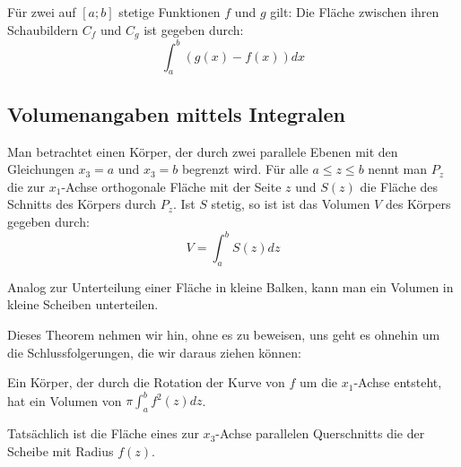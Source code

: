 \documentclass[main.tex]{subfiles}
\begin{document}
\begin{Theorem}
  Für zwei auf $[a;b]$ stetige Funktionen $f$ und $g$ gilt: Die Fläche zwischen ihren Schaubildern $C_f$ und $C_g$ ist gegeben durch:
  $$\displaystyle \int_a^b (g(x)-f(x))dx$$
\end{Theorem}


\subsection{Volumenangaben mittels Integralen}

\begin{Theorem}
  Man betrachtet einen Körper, der durch zwei parallele Ebenen mit den Gleichungen $x_3 = a$ und $x_3 = b$ begrenzt wird.
  Für alle $a\leq z \leq b$ nennt man $P_z$ die zur $x_1$-Achse orthogonale Fläche mit der Seite $z$ und $S(z)$ die Fläche des
  Schnitts des Körpers durch $P_z$. Ist $S$ stetig, so ist ist das Volumen $V$ des Körpers gegeben durch:
  $$V=\int_a^b S(z)dz$$
\end{Theorem}

\begin{Bemerkung}
  Analog zur Unterteilung einer Fläche in kleine Balken, kann man ein Volumen in kleine Scheiben unterteilen.
\end{Bemerkung}

\begin{Bemerkung}
  Dieses Theorem nehmen wir hin, ohne es zu beweisen, uns geht es ohnehin um die Schlussfolgerungen, die wir daraus ziehen können:
\end{Bemerkung}

\begin{Theorem}
  Ein Körper, der durch die Rotation der Kurve von $f$ um die $x_1$-Achse entsteht, hat ein Volumen von
  \( \displaystyle \pi \int_a^b f^2(z)dz\).

  Tatsächlich ist die Fläche eines zur $x_3$-Achse parallelen Querschnitts die der Scheibe mit Radius $f(z)$.
\end{Theorem}
\end{document}
